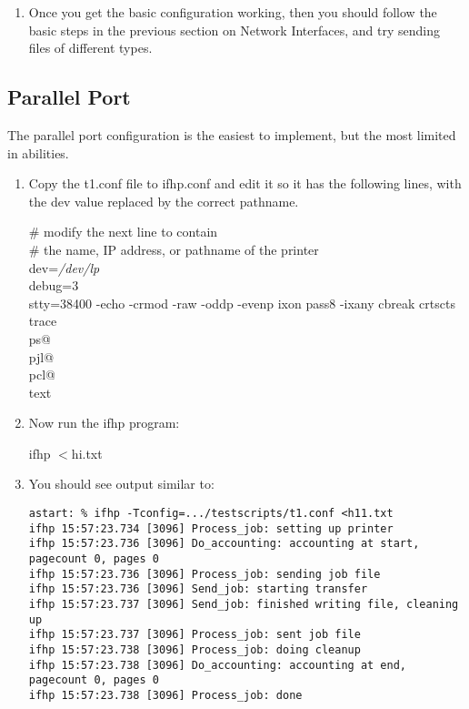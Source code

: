 \documentclass[a4paper]{article}
\begin{document}
\begin{enumerate}
\item Once you get the basic configuration working,
then you should follow the basic steps in the
previous section on Network Interfaces,
and try sending files of different types.
\end{enumerate}



\subsection{Parallel Port}

The parallel port configuration is the easiest to implement,
but the most limited in abilities.
\begin{enumerate}
\item Copy the
{\ttfamily t1.conf}
file to
{\ttfamily ifhp.conf} and edit it
so it has the following lines, with the
{\ttfamily dev} value replaced by the correct pathname.
\begin{tscreen}
\# modify the next line to contain \\ 
\#  the name, IP address, or pathname of the printer \\ 
dev={\itshape /dev/lp\/} \\ 
debug=3 \\ 
stty=38400 -echo -crmod -raw -oddp -evenp ixon pass8 -ixany cbreak crtscts \\ 
trace \\ 
ps@ \\ 
pjl@ \\ 
pcl@ \\ 
text \\ 
\end{tscreen}
\item Now run the
{\ttfamily ifhp}
program:
\begin{tscreen}
ifhp $<$hi.txt
\end{tscreen}
\item You should see output similar to:
\begin{tscreen}
\begin{verbatim}
astart: % ifhp -Tconfig=.../testscripts/t1.conf <h11.txt
ifhp 15:57:23.734 [3096] Process_job: setting up printer
ifhp 15:57:23.736 [3096] Do_accounting: accounting at start, pagecount 0, pages 0
ifhp 15:57:23.736 [3096] Process_job: sending job file
ifhp 15:57:23.736 [3096] Send_job: starting transfer
ifhp 15:57:23.737 [3096] Send_job: finished writing file, cleaning up
ifhp 15:57:23.737 [3096] Process_job: sent job file
ifhp 15:57:23.738 [3096] Process_job: doing cleanup
ifhp 15:57:23.738 [3096] Do_accounting: accounting at end, pagecount 0, pages 0
ifhp 15:57:23.738 [3096] Process_job: done
\end{verbatim}
\end{tscreen}


\end{enumerate}
\end{document}
